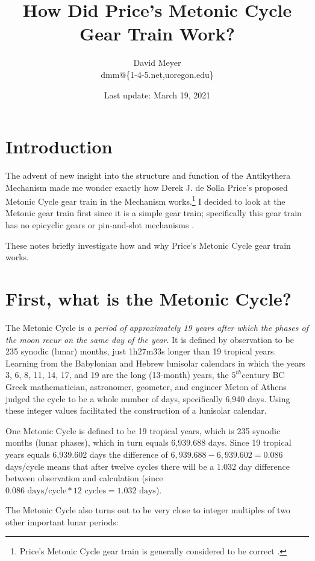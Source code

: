 \documentclass[11pt, oneside]{article}   	%
\title{How Did Price's Metonic Cycle Gear Train Work?}
\author{David Meyer \\ dmm@\{1-4-5.net,uoregon.edu\}}
\date{Last update: March 19, 2021}							%
\theoremstyle{definition}
\begin{document}
\maketitle

\section{Introduction}
The advent of new insight into the structure and function of the Antikythera Mechanism \cite{Freeth2021} made me wonder exactly how 
Derek J. de Solla Price's \cite{wiki:price} proposed Metonic Cycle gear train in the Mechanism works.\footnote{Price's Metonic Cycle gear train
is generally considered to be correct \cite{Freeth2006}.} I decided to look at the Metonic gear train first since it is a simple gear train; 
specifically this gear train has no epicyclic gears \cite{Wright2005} or pin-and-slot mechanisms \cite{Evans2010}.

\bigskip
\noindent
These notes briefly investigate how and why Price's Metonic Cycle gear train works.

\section{First, what is the Metonic Cycle?}
The Metonic Cycle is \emph{a period of approximately 19 years after which the phases of the moon recur on the same day of the year}. It is defined by 
observation to be 235 synodic (lunar) months,  just 1h27m33s longer than 19 tropical years. Learning from the Babylonian and Hebrew lunisolar calendars 
in which the years 3, 6, 8, 11, 14, 17, and 19 are the long (13-month) years, the $5^{th} \text{century BC}$ Greek mathematician, 
astronomer, geometer, and engineer Meton of Athens \cite{wiki:menton} judged the cycle to be a whole number of days, specifically 6,940 days. Using these integer 
values facilitated  the construction of a lunisolar calendar.

\bigskip
\noindent
One Metonic Cycle is defined to be 19 tropical years, which is 235 synodic months (lunar phases), which in turn equals 6,939.688 days. Since
19 tropical years equals 6,939.602 days the difference of  $6,939.688 - 6,939.602 = 0.086$ days/cycle means that after twelve cycles there 
will be a 1.032 day difference between observation and calculation (since $0.086 \text{ days/cycle} * 12 \text{ cycles} = 
1.032 \text{ days}$).  

\newpage
\bigskip
\noindent
The Metonic Cycle also turns out to be very close to integer multiples of two other important lunar periods:
\end{document}
